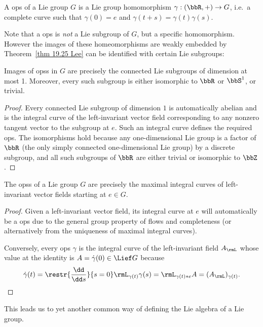\begin{defn}
    A \gls{ops} of a Lie group $G$ is a Lie group homomorphism $\gamma:(\bbR,+)\to G$, i.e.~a complete curve such that $\gamma(0)=e$ and $\gamma(t+s)=\gamma(t)\gamma(s)$.
\end{defn}

Note that a \gls{ops} is \emph{not} a Lie subgroup of $G$, but a specific homomorphism. However the images of these homeomorphisms are weakly embedded by Theorem~\ref{thm 19.25 Lee} can be identified with certain Lie subgroups:

\begin{prop}
    Images of \glspl{ops} in $G$ are precisely the connected Lie subgroups of dimension at most 1. Moreover, every such subgroup is either isomorphic to $\bbR$ or $\bbS^1$, or trivial.
\end{prop}
\begin{proof}
    Every connected Lie subgroup of dimension $1$ is automatically abelian and is the integral curve of the left-invariant vector field corresponding to any nonzero tangent vector to the subgroup at $e$. Such an integral curve defines the required \gls{ops}. The isomorphisms hold because any one-dimensional Lie group is a factor of $\bbR$ (the only simply connected one-dimensional Lie group) by a discrete subgroup, and all such subgroups of $\bbR$ are either trivial or isomorphic to $\bbZ$.
\end{proof}


\begin{thm}
    The \glspl{ops} of a Lie group $G$ are precisely the maximal integral curves of left-invariant vector fields starting at $e\in G$.
\end{thm}
\begin{proof}
    Given a left-invariant vector field, its integral curve at $e$ will automatically be a \gls{ops} due to the general group property of flows and completeness (or alternatively from the uniqueness of maximal integral curves).

    Conversely, every \gls{ops} $\gamma$ is the integral curve of the left-invariant field $A_\rmL$ whose value at the identity is $A=\dot\gamma(0)\in\Lief G$ because 
    \[\dot\gamma(t)=\restr{\frac{\dd}{\dd s}}{s=0}\rmL_{\gamma(t)}\gamma(s)=\rmL_{\gamma(t)\ast e}A=(A_\rmL)_{\gamma(t)}.\]
\end{proof}

This leads us to yet another common way of defining the Lie algebra of a Lie group.

